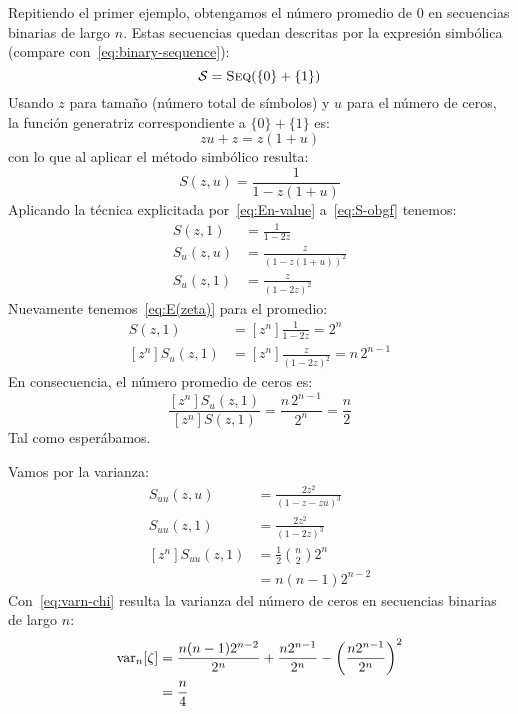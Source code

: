   Repitiendo el primer ejemplo,
  obtengamos el número promedio de \(0\) en secuencias binarias de largo \(n\).%
  Estas secuencias quedan descritas por la expresión simbólica
  (compare con~\eqref{eq:binary-sequence}):
  \begin{equation}
    \label{eq:S-class}
    \mathcal{S}
      = \operatorname{\textsc{Seq}}(\{0\} + \{1\})
  \end{equation}
  Usando \(z\) para tamaño
  (número total de símbolos)
  y \(u\) para el número de ceros,
  la función generatriz correspondiente a \(\{0\} + \{1\}\) es:
  \begin{equation}
    \label{eq:01-bgf}
    z u + z
      = z (1 + u)
  \end{equation}
  con lo que al aplicar el método simbólico resulta:
  \begin{equation}
    \label{eq:S-obgf}
    S(z, u)
      = \frac{1}{1 - z (1 + u)}
  \end{equation}
  Aplicando la técnica explicitada por~\eqref{eq:En-value}
  a~\eqref{eq:S-obgf} tenemos:
  \begin{align*}
    S(z, 1)
      &= \frac{1}{1 - 2 z} \\
    S_u(z, u)
      &= \frac{z}{(1 - z (1 + u))^2} \\
    S_u(z, 1)
      &= \frac{z}{(1 - 2 z)^2}
  \end{align*}
  Nuevamente tenemos~\eqref{eq:E(zeta)} para el promedio:%
  \begin{align*}
    [z^n] S(z, 1)
      &= [z^n] \frac{1}{1 - 2 z}
       = 2^n \\
    [z^n] S_u(z, 1)
      &= [z^n] \frac{z}{(1 - 2 z)^2}
       = n \, 2^{n - 1}
  \end{align*}
  En consecuencia,
  el número promedio de ceros es:
  \begin{equation}
    \label{eq:S-ave}
    \frac{[z^n] S_u(z, 1)}{[z^n] S(z, 1)}
      = \frac{n \, 2^{n - 1}}{2^n}
      = \frac{n}{2}
  \end{equation}
  Tal como esperábamos.

  Vamos por la varianza:%
  \begin{align*}
    S_{u u}(z, u)
      &= \frac{2 z^2}{(1 - z - z u)^3} \\
    S_{u u}(z, 1)
      &= \frac{2 z^2}{(1 - 2 z)^3} \\
    [z^n] S_{u u}(z, 1)
      &= \frac{1}{2} \binom{n}{2} 2^n \\
      &= n (n - 1) 2^{n - 2}
  \end{align*}
  Con~\eqref{eq:varn-chi}
  resulta la varianza del número de ceros
  en secuencias binarias de largo \(n\):
  \begin{align}
    \operatorname{var}_n[\zeta]
      &= \frac{n (n - 1) 2^{n - 2}}{2^n}
	   + \frac{n 2^{n - 1}}{2^n}
	   - \left( \frac{n 2^{n - 1}}{2^n} \right)^2 \notag \\
      &= \frac{n}{4} \label{eq:S-var}
  \end{align}

